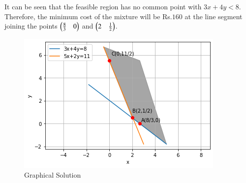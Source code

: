 \documentclass[journal,12pt,twocolumn]{IEEEtran}
\begin{document}
It can be seen that the feasible region has no common point with $3x+4y<8$. Therefore, the minimum cost of the mixture will be Rs.$160$ at the line segment joining the points $\begin{pmatrix}\frac{8}{3} & 0\end{pmatrix}$ and $\begin{pmatrix}2 & \frac{1}{2}\end{pmatrix}$.
\begin{figure}[!ht]
\centering
\includegraphics[width=\columnwidth]{Graphical Solution_10.png}
\caption{Graphical Solution}
\label{fig:Graphical Solution}	
\end{figure}
\end{document}
